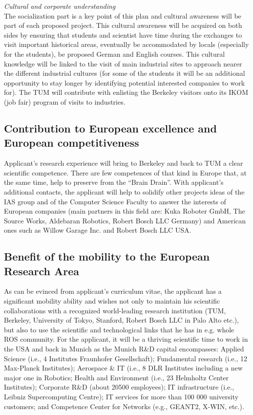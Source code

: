 \emph{Cultural  and corporate understanding}\\
The socialization  part is a
key point  of this plan  and cultural awareness  will be part  of each
proposed  project. This cultural  awareness will  be acquired  on both
sides by  ensuring that  students and scientist  have time  during the
exchanges   to  visit  important   historical  areas,   eventually  be
accommodated  by locals  (especially  for the  students), be  proposed
German and English courses. This  cultural knowledge will be linked to
the visit  of main industrial  sites to approach nearer  the different
industrial cultures (for some of the students it will be an additional
opportunity  to  stay   longer  by  identifying  potential  interested
companies to  work for).  The TUM will  contribute with  enlisting the
Berkeley visitors onto its IKOM (job fair) program of visits to industries.

\subsection{Contribution to European excellence and European competitiveness}
Applicant's  research experience  will  bring to  Berkeley and back  to TUM 
a clear scientific  competence. There are few competences of  that kind in 
Europe that, at  the same time, help to preserve  from the ``Brain Drain''.  
With applicant's additional contacts, the applicant will help to
solidify  other projects  ideas of  the  IAS group and  of the  Computer
Science Faculty  to   answer  the   interests  of  European   companies  (main
partners in this field are: Kuka Roboter GmbH, The Source
Works, Aldebaran  Robotics, Robert Bosch LLC Germany) and  American ones such as 
Willow Garage Inc. and Robert Bosch LLC USA.

\subsection{Benefit of the mobility to the European Research Area} 
As  can be  evinced from  applicant's curriculum  vitae, the applicant  
has  a significant mobility  ability  and  wishes  not  only to  maintain  his  scientific
collaborations  with a  recognized world-leading  research institution
(TUM, Berkeley, University of Tokyo, Stanford, Robert Bosch LLC in Palo
Alto etc.), but also  to use the  scientific and  technological links
that he has in e.g. whole ROS community. For the applicant, it will  be 
a thriving scientific time to work in  the USA and back in Munich as  
the Munich R\&D capital encompasses:   Applied   Science   (i.e.,  4   Institutes   Fraunhofer
Gesellschaft); Fundamental research  (i.e., 12 Max-Planck Institutes);
Aerospace \&  IT (i.e., 8 DLR  Institutes including a new  major one in
Robotics;   Health  and   Environment  (i.e.,   23   Helmholtz  Center
Institutes); Corporate R\&D  (about 20500 employees); IT infrastructure
(i.e., Leibniz  Supercomputing Centre); IT services for  more than 100
000 university  customers; and  Competence Center for  Networks (e.g.,
GEANT2, X-WIN,  etc.).  

